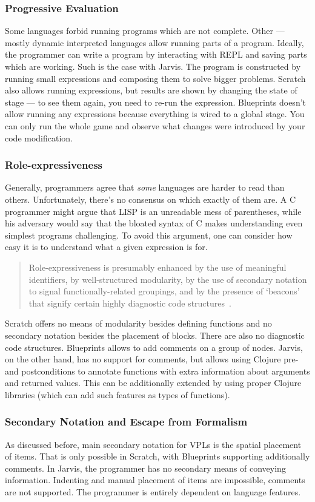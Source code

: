 \documentclass[english,mgr,shortabstract]{iithesis}
\begin{document}
\subsubsection*{Progressive Evaluation}
Some languages forbid running programs which are not complete.
Other --- mostly dynamic interpreted languages allow running parts of a program.
Ideally, the programmer can write a program by interacting with REPL and saving
parts which are working.
Such is the case with Jarvis.
The program is constructed by running small expressions and composing them to
solve bigger problems.
Scratch also allows running expressions, but results are shown by changing the
state of stage --- to see them again, you need to re-run the expression.
Blueprints doesn’t allow running any expressions because everything is wired to
a global stage.
You can only run the whole game and observe what changes were introduced by your
code modification.

\subsubsection*{Role-expressiveness}
Generally, programmers agree that \emph{some} languages are harder to read than others.
Unfortunately, there’s no consensus on which exactly of them are.
A C programmer might argue that LISP is an unreadable mess of parentheses, while
his adversary would say that the bloated syntax of C makes understanding even
simplest programs challenging.
To avoid this argument, one can consider how easy it is to understand what a
given expression is for.

\blockquote{Role-expressiveness is presumably
  enhanced by the use of meaningful identifiers, by well-structured modularity,
  by the use of secondary notation to signal functionally-related groupings, and
  by the presence of ‘beacons’ that signify certain highly diagnostic code
  structures~\cite{Green96UsabilityAnalysis}.}

Scratch offers no means of modularity besides defining functions and no
secondary notation besides the placement of blocks.
There are also no diagnostic code structures.
Blueprints allows to add comments on a group of nodes.
Jarvis, on the other hand, has no support for comments, but allows using
Clojure pre- and postconditions to annotate functions with extra information
about arguments and returned values.
This can be additionally extended by using proper Clojure libraries (which can
add such features as types of functions).

\subsubsection*{Secondary Notation and Escape from Formalism}
As discussed before, main secondary notation for VPLs is the spatial placement
of items.
That is only possible in Scratch, with Blueprints supporting additionally
comments.
In Jarvis, the programmer has no secondary means of conveying information.
Indenting and manual placement of items are impossible, comments are not
supported.
The programmer is entirely dependent on language features.
\end{document}

